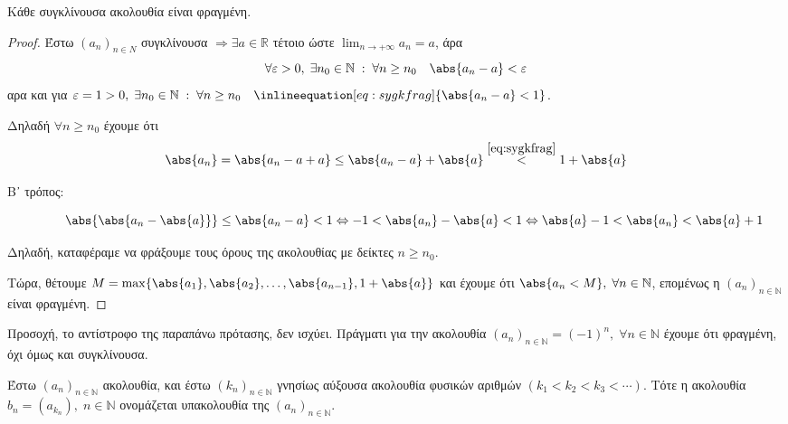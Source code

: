 \documentclass[main.tex]{subfiles}
\begin{document}

\begin{thm}
    Κάθε συγκλίνουσα ακολουθία είναι φραγμένη.
\end{thm}

\begin{proof}
    Έστω $ (a_{n})_{n \in \mathbb{Ν}} $ συγκλίνουσα $ \Rightarrow \exists a \in 
    \mathbb{R} $ τέτοιο ώστε $ \lim_{n \to +\infty} a_{n}=a $, άρα 
\[
    \forall \varepsilon > 0, \; \exists n_{0} \in \mathbb{N} \; : \; \forall n \geq 
    n_{0}\quad \abs{a_{n}-a} < \varepsilon  
 \] 
 αρα και για $ \varepsilon =1>0, \; \exists n_{0} \in \mathbb{N} \; : \; \forall n \geq 
 n_{0} \quad \inlineequation[eq:sygkfrag]{\abs{a_{n}-a} < 1} $. 
 
 Δηλαδή $ \forall n \geq n_{0} $ έχουμε ότι 
\[
    \abs{a_{n}} = \abs{a_{n}-a + a} \leq \abs{a_{n} - a} + \abs{a} 
    \overset{\eqref{eq:sygkfrag}}{<} 1 + \abs{a}  
 \] 

 \begin{description}
     \item [Β᾽ τρόπος:] \[ \abs{\abs{a_{n} - \abs{a}}} \leq \abs{a_{n}- a} < 1 \Leftrightarrow -1 <
         \abs{a_{n}} - \abs{a} < 1 \Leftrightarrow \abs{a} -1 < \abs{a_{n}} < \abs{a} + 1 \]
 \end{description}

 Δηλαδή, καταφέραμε να φράξουμε τους όρους της ακολουθίας με δείκτες $n \geq n_{0} $.

 Τώρα, θέτουμε $ M = \max \{ \abs{a_{1}} , \abs{a_{2}} , \ldots, \abs{a_{n-1}} , 1 + 
 \abs{a}\} $ και έχουμε ότι $ \abs{a_{n} < M}, \; \forall n \in \mathbb{N} $, επομένως 
 η $ (a_{n})_{n \in \mathbb{N}} $ είναι φραγμένη.
\end{proof}

\begin{rem}
    Προσοχή, το αντίστροφο της παραπάνω πρότασης, δεν ισχύει. Πράγματι για την  ακολουθία 
    $ (a_{n})_{n \in \mathbb{N}} = (-1)^{n}, \; \forall n \in \mathbb{N} $ έχουμε ότι  
    φραγμένη, όχι όμως και συγκλίνουσα.
\end{rem}

\begin{dfn}
    Έστω $ (a_{n})_{n \in \mathbb{N}} $ ακολουθία, και έστω $ (k_{n})_{n \in \mathbb{N}} $ γνησίως
    αύξουσα ακολουθία φυσικών αριθμών $ (k_{1}<k_{2}<k_{3}<\cdots) $. Τότε η ακολουθία 
    $ b_{n} = (a_{k_{n}}), \; n \in \mathbb{N} $ ονομάζεται υπακολουθία της 
    $ (a_{n})_{n \in \mathbb{N}} $.
\end{dfn}
\end{document}

